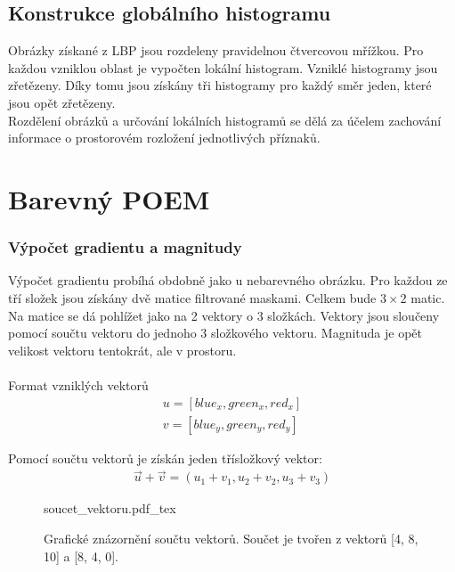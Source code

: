 \documentclass[czech,BP]{thesiskiv}
\begin{document}
\subsection{Konstrukce globálního histogramu}
\par Obrázky získané z LBP jsou rozdeleny pravidelnou čtvercovou mřížkou. Pro každou vzniklou oblast je vypočten lokální histogram. Vzniklé histogramy jsou zřetězeny. Díky tomu jsou získány tři histogramy pro každý směr jeden, které jsou opět zřetězeny. \\
Rozdělení obrázků a určování lokálních histogramů se dělá za účelem zachování informace o prostorovém rozložení jednotlivých příznaků.

\section{Barevný POEM}
\subsubsection{Výpočet gradientu a magnitudy}
Výpočet gradientu probíhá obdobně jako u nebarevného obrázku. Pro každou ze tří složek jsou získány dvě matice filtrované maskami. Celkem bude $3 \times 2$ matic. Na matice se dá pohlížet jako na 2 vektory o 3 složkách. Vektory jsou sloučeny pomocí součtu vektoru do jednoho 3 složkového vektoru. Magnituda je opět velikost vektoru tentokrát, ale v prostoru. \\
\\
Format vzniklých vektorů 
\begin{align}
	\label{barevny_poem_vznikle_vektory}
			 u = [blue_x, green_x, red_x] \\
			 v = [blue_y, green_y, red_y]
\end{align}

Pomocí součtu vektorů je získán jeden třísložkový vektor:
\begin{align}
   \label{soucet_vektrou} \vec{u} + \vec{v} = (u_1 + v_1, u_2 + v_2, u_3 + v_3 )
\end{align} 

\begin{figure}[H]
    \centering
    \def\svgwidth{\columnwidth}
    {soucet_vektoru.pdf_tex} 
    \caption{Grafické znázornění součtu vektorů. Součet je tvořen z vektorů [4, 8, 10] a [8, 4, 0].}
\end{figure}
\end{document}
